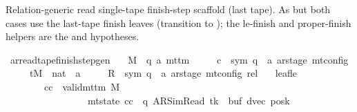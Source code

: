 \begin{isabellebody}
%
\begin{isamarkuptext}%
Relation-generic read single-tape finish-step scaffold
  (last tape).  As  but both cases use the
  last-tape finish leaves (transition to ); the
  le-finish and proper-finish helpers are the  and
   hypotheses.%
\end{isamarkuptext}\isamarkuptrue%
\isamarkupfalse%
\ ar{\isacharunderscore}{\kern0pt}read{\isacharunderscore}{\kern0pt}tape{\isacharunderscore}{\kern0pt}finish{\isacharunderscore}{\kern0pt}step{\isacharunderscore}{\kern0pt}gen{\isacharcolon}{\kern0pt}\isanewline
\ \ \ M\ {\isacharcolon}{\kern0pt}{\isacharcolon}{\kern0pt}\ {\isachardoublequoteopen}{\isacharparenleft}{\kern0pt}{\isacharprime}{\kern0pt}q{\isacharcomma}{\kern0pt}\ {\isacharprime}{\kern0pt}a{\isacharparenright}{\kern0pt}\ mttm{\isachardoublequoteclose}\isanewline
\ \ \ \ \ c{\isacharprime}{\kern0pt}\ {\isacharcolon}{\kern0pt}{\isacharcolon}{\kern0pt}\ {\isachardoublequoteopen}{\isacharparenleft}{\kern0pt}sym{}{\isacharcomma}{\kern0pt}\ {\isacharprime}{\kern0pt}q\ {\isasymtimes}\ {\isacharprime}{\kern0pt}a\ ar{\isacharunderscore}{\kern0pt}stage{\isacharparenright}{\kern0pt}\ mt{\isacharunderscore}{\kern0pt}config{\isachardoublequoteclose}\isanewline
\ \ \ \ \ tM\ {\isacharcolon}{\kern0pt}{\isacharcolon}{\kern0pt}\ {\isachardoublequoteopen}nat\ {\isasymRightarrow}\ {\isacharprime}{\kern0pt}a{\isachardoublequoteclose}\isanewline
\ \ \ \ \ R{\isacharprime}{\kern0pt}\ {\isacharcolon}{\kern0pt}{\isacharcolon}{\kern0pt}\ {\isachardoublequoteopen}{\isacharparenleft}{\kern0pt}sym{}{\isacharcomma}{\kern0pt}\ {\isacharprime}{\kern0pt}q\ {\isasymtimes}\ {\isacharprime}{\kern0pt}a\ ar{\isacharunderscore}{\kern0pt}stage{\isacharparenright}{\kern0pt}\ mt{\isacharunderscore}{\kern0pt}config\ rel{\isachardoublequoteclose}\isanewline
\ \ \ leaf{\isacharunderscore}{\kern0pt}le{\isacharcolon}{\kern0pt}\isanewline
\ \ \ \ \ \ \ \ {\isachardoublequoteopen}{\isasymAnd}cc{\isachardot}{\kern0pt}\ {\isasymlbrakk}\ valid{\isacharunderscore}{\kern0pt}mttm\ M{\isacharsemicolon}{\kern0pt}\isanewline
\ \ \ \ \ \ \ \ \ \ \ \ \ \ \ \ \ mt{\isacharunderscore}{\kern0pt}state\ cc\ {\isacharequal}{\kern0pt}\ {\isacharparenleft}{\kern0pt}q{\isacharcomma}{\kern0pt}\ AR{\isacharunderscore}{\kern0pt}SimRead{\isacharcomma}{\kern0pt}\ tk{\isacharcomma}{\kern0pt}\ {}{\isacharcomma}{\kern0pt}\ buf{\isacharcomma}{\kern0pt}\ dvec{\isacharcomma}{\kern0pt}\ posk{\isacharparenright}{\kern0pt}{\isacharsemicolon}{\kern0pt}\isanewline

\end{isabellebody}
